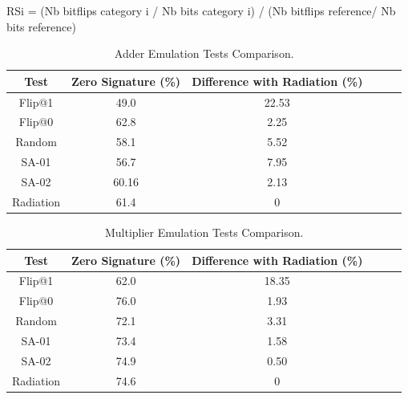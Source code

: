 RSi = (Nb bitflips category i /  Nb bits category i) / (Nb bitflips reference/  Nb bits reference)






\begin{table}[tb!]
\center
\caption{Adder Emulation Tests Comparison.}

\label{AE}

\begin{tabular}{|c | c| c | c| c| c |} 
 \hline
Test & Zero Signature (\%) & Difference with Radiation (\%)   \\ 
\hline

 
 
 Flip@1& 49.0 &22.53   \\
 \hline
 Flip@0 & 62.8 & 2.25 \\ 
 \hline
 
 Random & 58.1 & 5.52  \\
 \hline
 SA-01 & 56.7 & 7.95 \\
 \hline
 SA-02 & 60.16 & 2.13  \\
 \hline
 Radiation & 61.4 & 0  \\
 \hline
 
 
\end{tabular}
\end{table}


\begin{table}[tb!]
\center
\caption{Multiplier Emulation Tests Comparison.}

\label{ME}

\begin{tabular}{|c | c| c | c| c| c |} 
 \hline
Test & Zero Signature (\%) & Difference with Radiation (\%)   \\ 
\hline

 
 
 Flip@1& 62.0 &18.35   \\
 \hline
 Flip@0 & 76.0 & 1.93 \\ 
 \hline
 
 Random & 72.1 & 3.31  \\
 \hline
 SA-01 & 73.4 & 1.58 \\
 \hline
 SA-02 & 74.9 &  0.50\\
 \hline
 Radiation & 74.6 & 0  \\
 \hline
 
 
\end{tabular}
\end{table}



